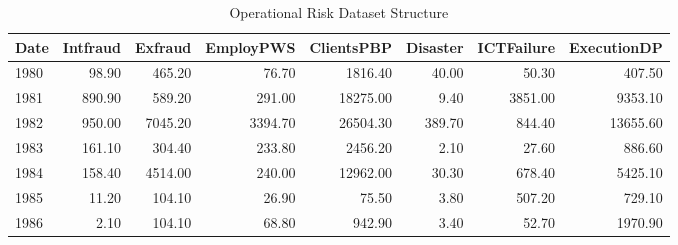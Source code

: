 \begin{table}[h]
    \centering
    \begin{tabular}{lrrrrrrr}
        \hline
        \textbf{Date} & \textbf{Intfraud} & \textbf{Exfraud} & \textbf{EmployPWS} & \textbf{ClientsPBP} & \textbf{Disaster} & \textbf{ICTFailure} & \textbf{ExecutionDP} \\
        \hline
        1980 & 98.90 & 465.20 & 76.70 & 1816.40 & 40.00 & 50.30 & 407.50 \\
        1981 & 890.90 & 589.20 & 291.00 & 18275.00 & 9.40 & 3851.00 & 9353.10 \\
        1982 & 950.00 & 7045.20 & 3394.70 & 26504.30 & 389.70 & 844.40 & 13655.60 \\
        1983 & 161.10 & 304.40 & 233.80 & 2456.20 & 2.10 & 27.60 & 886.60 \\
        1984 & 158.40 & 4514.00 & 240.00 & 12962.00 & 30.30 & 678.40 & 5425.10 \\
        1985 & 11.20 & 104.10 & 26.90 & 75.50 & 3.80 & 507.20 & 729.10 \\
        1986 & 2.10 & 104.10 & 68.80 & 942.90 & 3.40 & 52.70 & 1970.90 \\
        \hline
    \end{tabular}
    \caption{Operational Risk Dataset Structure}
    \label{tab:Operational Risk Dataset Structure}
\end{table}
